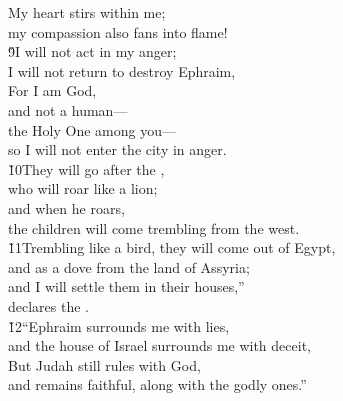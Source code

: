\begin{poetry}
\poeml My heart stirs within me; \\
\poemll    my compassion also fans into flame! \\
\poeml \v{9}I will not act in my anger; \\
\poemll    I will not return to destroy Ephraim, \\
\poeml For I am God, \\
\poemll    and not a human--- \\
\poeml the Holy One among you--- \\
\poemll    so I will not enter the city in anger. \\
\poeml \v{10}They will go after the , \\
\poemll    who will roar like a lion; \\
\poeml and when he roars, \\
\poemll    the children will come trembling from the west. \\
\poeml \v{11}Trembling like a bird, they will come out of Egypt, \\
\poemll    and as a dove from the land of Assyria; \\
\poeml and I will settle them in their houses,'' \\
\poemll    declares the . \\
\poeml \v{12}``Ephraim surrounds me with lies, \\
\poemll    and the house of Israel surrounds me with deceit, \\
\poeml But Judah still rules with God, \\
\poemll    and remains faithful, along with the godly ones.''
\end{poetry}

